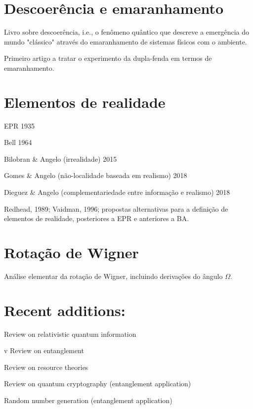 \documentclass[11pt,a4paper,notitlepage]{article}
\begin{document}
\section{Descoerência e emaranhamento}

\cite{schlosshauer_2010} Livro sobre descoerência, i.e., o fenômeno quântico que descreve a emergência do mundo "clássico" através do emaranhamento de sistemas físicos com o ambiente.

\cite{wootters_zurek_1979} Primeiro artigo a tratar o experimento da dupla-fenda em termos de emaranhamento.

\section{Elementos de realidade}

\cite{epr_1935} EPR 1935

\cite{bell_1964} Bell 1964

\cite{bilobran_angelo_2015} Bilobran \& Angelo (irrealidade) 2015

\cite{gomes_angelo_2018} Gomes \& Angelo (não-localidade baseada em realismo) 2018

\cite{dieguez_angelo_2018} Dieguez \& Angelo (complementariedade entre informação e realismo) 2018

\cite{redhead_1989} \cite{vaidman_1996} Redhead, 1989; Vaidman, 1996; propostas alternativas para a definição  de elementos de realidade, posteriores a EPR e anteriores a BA.

\section{Rotação de Wigner}

\cite{visser_2011} Análise elementar da rotação de Wigner, incluindo derivações do ângulo $\Omega$.

\section{Recent additions:}

\cite{peres_2004} Review on relativistic quantum information

\cite{horodecki_2009} v Review on entanglement

\cite{chitambar_2019} Review on resource theories

\cite{gisin_2002} Review on quantum cryptography (entanglement application)

\cite{pironio_2010} Random number generation (entanglement application)
\end{document}
